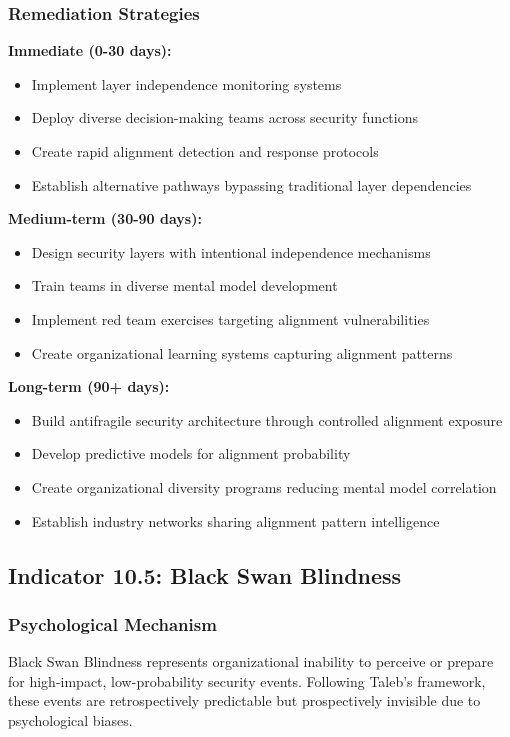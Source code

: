 \documentclass[11pt,a4paper]{article}
\begin{document}
\subsubsection{Remediation Strategies}

\textbf{Immediate (0-30 days):}
\begin{itemize}
\item Implement layer independence monitoring systems
\item Deploy diverse decision-making teams across security functions
\item Create rapid alignment detection and response protocols
\item Establish alternative pathways bypassing traditional layer dependencies
\end{itemize}

\textbf{Medium-term (30-90 days):}
\begin{itemize}
\item Design security layers with intentional independence mechanisms
\item Train teams in diverse mental model development
\item Implement red team exercises targeting alignment vulnerabilities
\item Create organizational learning systems capturing alignment patterns
\end{itemize}

\textbf{Long-term (90+ days):}
\begin{itemize}
\item Build antifragile security architecture through controlled alignment exposure
\item Develop predictive models for alignment probability
\item Create organizational diversity programs reducing mental model correlation
\item Establish industry networks sharing alignment pattern intelligence
\end{itemize}

\subsection{Indicator 10.5: Black Swan Blindness}

\subsubsection{Psychological Mechanism}

Black Swan Blindness represents organizational inability to perceive or prepare for high-impact, low-probability security events. Following Taleb's\cite{taleb2007} framework, these events are retrospectively predictable but prospectively invisible due to psychological biases.
\end{document}
